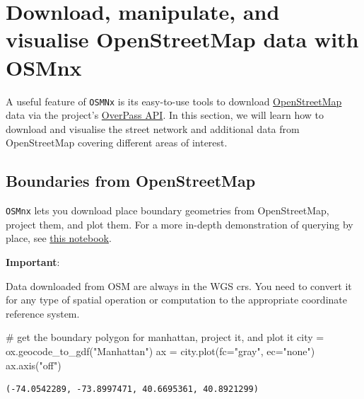 \documentclass[
  letterpaper,
  DIV=11,
  numbers=noendperiod]{scrreprt}
\newenvironment{Shaded}{\begin{snugshade}}{\end{snugshade}}
\newcommand{\CommentTok}[1]{\textcolor[rgb]{0.37,0.37,0.37}{#1}}
\newcommand{\NormalTok}[1]{\textcolor[rgb]{0.00,0.23,0.31}{#1}}
\newcommand{\OperatorTok}[1]{\textcolor[rgb]{0.37,0.37,0.37}{#1}}
\newcommand{\StringTok}[1]{\textcolor[rgb]{0.13,0.47,0.30}{#1}}
\begin{document}
\hypertarget{download-manipulate-and-visualise-openstreetmap-data-with-osmnx}{%
\section{Download, manipulate, and visualise OpenStreetMap data with
OSMnx}\label{download-manipulate-and-visualise-openstreetmap-data-with-osmnx}}

A useful feature of \texttt{OSMNx} is its easy-to-use tools to download
\href{http://www.openstreetmap.org}{OpenStreetMap} data via the
project's
\href{http://wiki.openstreetmap.org/wiki/Overpass_API}{OverPass API}. In
this section, we will learn how to download and visualise the street
network and additional data from OpenStreetMap covering different areas
of interest.

\hypertarget{boundaries-from-openstreetmap}{%
\subsection{Boundaries from
OpenStreetMap}\label{boundaries-from-openstreetmap}}

\texttt{OSMnx} lets you download place boundary geometries from
OpenStreetMap, project them, and plot them. For a more in-depth
demonstration of querying by place, see
\href{03-graph-place-queries.ipynb}{this notebook}.

\textbf{Important}:

Data downloaded from OSM are always in the WGS crs. You need to convert
it for any type of spatial operation or computation to the appropriate
coordinate reference system.

\begin{Shaded}
\begin{Highlighting}[]
\CommentTok{\# get the boundary polygon for manhattan, project it, and plot it}
\NormalTok{city }\OperatorTok{=}\NormalTok{ ox.geocode\_to\_gdf(}\StringTok{"Manhattan"}\NormalTok{)}
\NormalTok{ax }\OperatorTok{=}\NormalTok{ city.plot(fc}\OperatorTok{=}\StringTok{"gray"}\NormalTok{, ec}\OperatorTok{=}\StringTok{"none"}\NormalTok{)}
\NormalTok{ax.axis(}\StringTok{"off"}\NormalTok{)}
\end{Highlighting}
\end{Shaded}

\begin{verbatim}
(-74.0542289, -73.8997471, 40.6695361, 40.8921299)
\end{verbatim}
\end{document}
